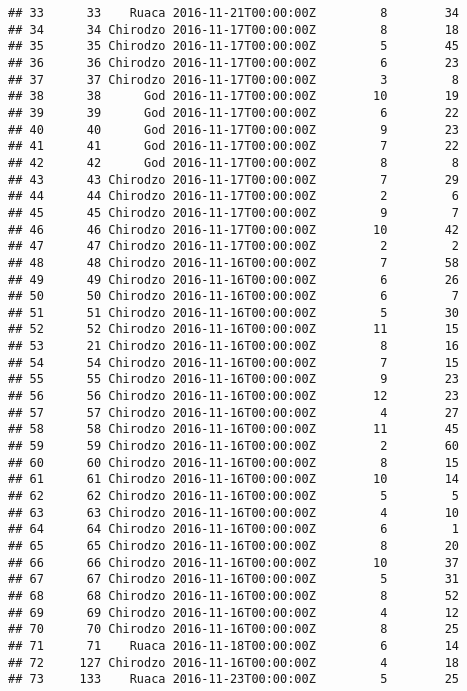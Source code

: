 \documentclass[
]{article}
\begin{document}
\begin{verbatim}
## 33      33    Ruaca 2016-11-21T00:00:00Z         8        34
## 34      34 Chirodzo 2016-11-17T00:00:00Z         8        18
## 35      35 Chirodzo 2016-11-17T00:00:00Z         5        45
## 36      36 Chirodzo 2016-11-17T00:00:00Z         6        23
## 37      37 Chirodzo 2016-11-17T00:00:00Z         3         8
## 38      38      God 2016-11-17T00:00:00Z        10        19
## 39      39      God 2016-11-17T00:00:00Z         6        22
## 40      40      God 2016-11-17T00:00:00Z         9        23
## 41      41      God 2016-11-17T00:00:00Z         7        22
## 42      42      God 2016-11-17T00:00:00Z         8         8
## 43      43 Chirodzo 2016-11-17T00:00:00Z         7        29
## 44      44 Chirodzo 2016-11-17T00:00:00Z         2         6
## 45      45 Chirodzo 2016-11-17T00:00:00Z         9         7
## 46      46 Chirodzo 2016-11-17T00:00:00Z        10        42
## 47      47 Chirodzo 2016-11-17T00:00:00Z         2         2
## 48      48 Chirodzo 2016-11-16T00:00:00Z         7        58
## 49      49 Chirodzo 2016-11-16T00:00:00Z         6        26
## 50      50 Chirodzo 2016-11-16T00:00:00Z         6         7
## 51      51 Chirodzo 2016-11-16T00:00:00Z         5        30
## 52      52 Chirodzo 2016-11-16T00:00:00Z        11        15
## 53      21 Chirodzo 2016-11-16T00:00:00Z         8        16
## 54      54 Chirodzo 2016-11-16T00:00:00Z         7        15
## 55      55 Chirodzo 2016-11-16T00:00:00Z         9        23
## 56      56 Chirodzo 2016-11-16T00:00:00Z        12        23
## 57      57 Chirodzo 2016-11-16T00:00:00Z         4        27
## 58      58 Chirodzo 2016-11-16T00:00:00Z        11        45
## 59      59 Chirodzo 2016-11-16T00:00:00Z         2        60
## 60      60 Chirodzo 2016-11-16T00:00:00Z         8        15
## 61      61 Chirodzo 2016-11-16T00:00:00Z        10        14
## 62      62 Chirodzo 2016-11-16T00:00:00Z         5         5
## 63      63 Chirodzo 2016-11-16T00:00:00Z         4        10
## 64      64 Chirodzo 2016-11-16T00:00:00Z         6         1
## 65      65 Chirodzo 2016-11-16T00:00:00Z         8        20
## 66      66 Chirodzo 2016-11-16T00:00:00Z        10        37
## 67      67 Chirodzo 2016-11-16T00:00:00Z         5        31
## 68      68 Chirodzo 2016-11-16T00:00:00Z         8        52
## 69      69 Chirodzo 2016-11-16T00:00:00Z         4        12
## 70      70 Chirodzo 2016-11-16T00:00:00Z         8        25
## 71      71    Ruaca 2016-11-18T00:00:00Z         6        14
## 72     127 Chirodzo 2016-11-16T00:00:00Z         4        18
## 73     133    Ruaca 2016-11-23T00:00:00Z         5        25

\end{verbatim}
\end{document}
